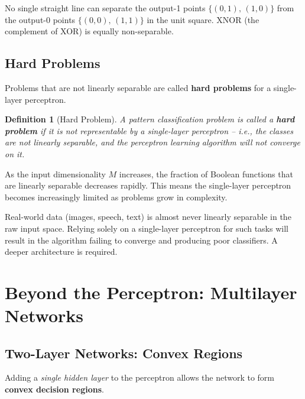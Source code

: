 \documentclass[12pt,a4paper]{article}
\newtheorem{definition}{Definition}[section]
\begin{document}
No single straight line can separate the output-1 points
$\{(0,1),\,(1,0)\}$ from the output-0 points $\{(0,0),\,(1,1)\}$
in the unit square.
XNOR (the complement of XOR) is equally non-separable.

\subsection{Hard Problems}
\label{subsec:hard-problems}

Problems that are not linearly separable are called \textbf{hard
problems} for a single-layer perceptron.

\begin{definition}[Hard Problem]
\label{def:hard-problem}
A pattern classification problem is called a \textbf{hard problem} if
it is not representable by a single-layer perceptron -- i.e., the
classes are not linearly separable, and the perceptron learning
algorithm will not converge on it.
\end{definition}

As the input dimensionality $M$ increases, the fraction of Boolean
functions that are linearly separable decreases rapidly.
This means the single-layer perceptron becomes increasingly limited
as problems grow in complexity.

\begin{warningbox}[title=Practical Implication]
Real-world data (images, speech, text) is almost never linearly
separable in the raw input space.
Relying solely on a single-layer perceptron for such tasks will result
in the algorithm failing to converge and producing poor classifiers.
A deeper architecture is required.
\end{warningbox}

\section{Beyond the Perceptron: Multilayer Networks}
\label{sec:mlp}

\subsection{Two-Layer Networks: Convex Regions}
\label{subsec:two-layer}

Adding a \emph{single hidden layer} to the perceptron allows the
network to form \textbf{convex decision regions}.
\end{document}
